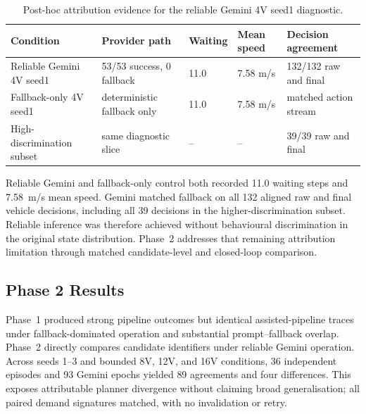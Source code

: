 \documentclass[letterpaper,10pt,conference]{ieeeconf}
\begin{document}
\begin{table}[t]

\centering

\caption{Post-hoc attribution evidence for the reliable Gemini 4V seed1 diagnostic.}

\label{tab:posthoc_attribution}

\renewcommand{\arraystretch}{1.08}

\scriptsize

\begin{tabular}{p{1.4cm} p{1.3cm} p{0.9cm} p{1.0cm} p{1.5cm}}

\toprule

\textbf{Condition} & \textbf{Provider path} & \textbf{Waiting} & \textbf{Mean speed} & \textbf{Decision agreement} \\

\midrule

Reliable Gemini 4V seed1 & 53/53 success, 0 fallback & 11.0 & 7.58 m/s & 132/132 raw and final \\

Fallback-only 4V seed1 & deterministic fallback only & 11.0 & 7.58 m/s & matched action stream \\

High-discrimination subset & same diagnostic slice & -- & -- & 39/39 raw and final \\

\bottomrule

\end{tabular}

\end{table}





Reliable Gemini and fallback-only control both recorded 11.0 waiting steps and 7.58~m/s mean speed. Gemini matched fallback on all 132 aligned raw and final vehicle decisions, including all 39 decisions in the higher-discrimination subset. Reliable inference was therefore achieved without behavioural discrimination in the original state distribution. Phase~2 addresses that remaining attribution limitation through matched candidate-level and closed-loop comparison.



\subsection{Phase 2 Results}



Phase~1 produced strong pipeline outcomes but identical assisted-pipeline traces under fallback-dominated operation and substantial prompt--fallback overlap. Phase~2 directly compares candidate identifiers under reliable Gemini operation. Across seeds 1--3 and bounded 8V, 12V, and 16V conditions, 36 independent episodes and 93 Gemini epochs yielded 89 agreements and four differences. This exposes attributable planner divergence without claiming broad generalisation; all paired demand signatures matched, with no invalidation or retry.
\end{document}
